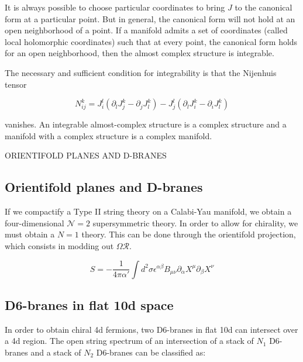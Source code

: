 It is always possible to choose particular coordinates to bring $J$ to the canonical form at a particular 
point.
But in general, the canonical form will not hold at an open neighborhood of a point.
If a manifold admits a set of coordinates (called local holomorphic coordinates) such that at every
point, the canonical form holds for an open neighborhood, then the almost complex structure is integrable.

The necessary and sufficient condition for integrability is that the Nijenhuis tensor

\begin{equation}
  N^k_{ij}= J^l_i(\partial_l J^k_j - \partial_j J^k_l) - J_j^l (\partial_l J^k_i - \partial_i J^k_l)
\end{equation}

vanishes.
An integrable almost-complex structure is a complex structure and a manifold with a complex structure
is a complex manifold.






ORIENTIFOLD PLANES AND D-BRANES

\subsection{Orientifold planes and D-branes}

If we compactify a Type II string theory on a Calabi-Yau manifold, we  obtain a four-dimensional
$\mathcal N=2$ supersymmetric theory.
In order to allow for chirality, we must obtain a $N=1$ theory. This can be done through the orientifold
projection, which consists in modding out $\Omega \mathcal R$.


\begin{equation}
  S= -\frac{1}{4\pi \alpha'}\int d^2\sigma \epsilon^{\alpha\beta} B_{\mu\nu}  \partial_\alpha X^\mu \partial_\beta X^\nu
\end{equation}

\subsection{D6-branes in flat 10d space}

In order to obtain chiral 4d fermions, two D6-branes in flat 10d can intersect over a 4d region.
The open string spectrum of an intersection of a stack of $N_1$ D6-branes and a stack of $N_2$ D6-branes
can be classified as:

